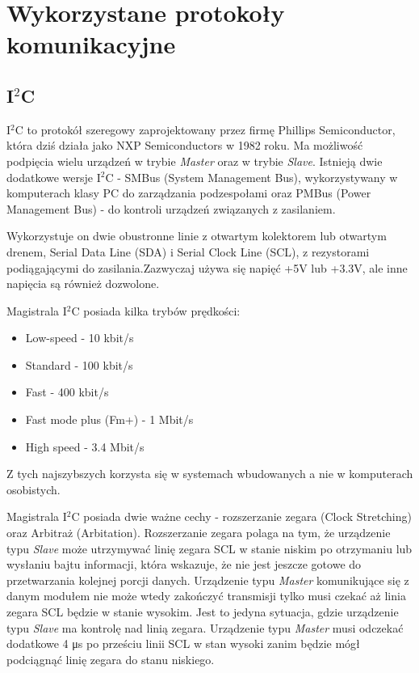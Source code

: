 \documentclass[12pt,a4paper,oneside]{memoir}
\begin{document}
\chapter{Wykorzystane protokoły komunikacyjne}
\section{I$^2$C}
\par I$^2$C \cite{i2cwiki} to protokół szeregowy zaprojektowany przez firmę Phillips Semiconductor, która dziś działa jako NXP Semiconductors w 1982 roku. Ma możliwość podpięcia wielu urządzeń w trybie \textit{Master} oraz w trybie \textit{Slave}. Istnieją dwie dodatkowe wersje I$^2$C - SMBus (System Management Bus), wykorzystywany w komputerach klasy PC do zarządzania podzespołami oraz PMBus (Power Management Bus) - do kontroli urządzeń związanych z zasilaniem. 
\par Wykorzystuje on dwie obustronne linie z otwartym kolektorem lub otwartym drenem, Serial Data Line (SDA) i Serial Clock Line (SCL), z rezystorami podiągającymi do zasilania.Zazwyczaj używa się napięć +5V lub +3.3V, ale inne napięcia są również dozwolone.
\par Magistrala I$^2$C posiada kilka trybów prędkości:
\begin{itemize}
	\item Low-speed - 10 kbit/s
	\item Standard - 100 kbit/s
	\item Fast - 400 kbit/s
	\item Fast mode plus (Fm+) - 1 Mbit/s
	\item High speed - 3.4 Mbit/s
\end{itemize}
\par Z tych najszybszych korzysta się w systemach wbudowanych a nie w komputerach osobistych.\\
\par Magistrala I$^2$C posiada dwie ważne cechy - rozszerzanie zegara (Clock Stretching) oraz Arbitraż (Arbitation). 
Rozszerzanie zegara polaga na tym, że urządzenie typu \textit{Slave} może utrzymywać linię zegara SCL w stanie niskim po otrzymaniu lub wysłaniu bajtu informacji, która wskazuje, że nie jest jeszcze gotowe do przetwarzania kolejnej porcji danych. Urządzenie typu \textit{Master} komunikujące się z danym modułem nie może wtedy zakończyć transmisji tylko musi czekać aż linia zegara SCL będzie w stanie wysokim. Jest to jedyna sytuacja, gdzie urządzenie typu \textit{Slave} ma kontrolę nad linią zegara. Urządzenie typu \textit{Master} musi odczekać dodatkowe 4 μs po prześciu linii SCL w stan wysoki zanim będzie mógł podciągnąć linię zegara do stanu niskiego.
\end{document}
